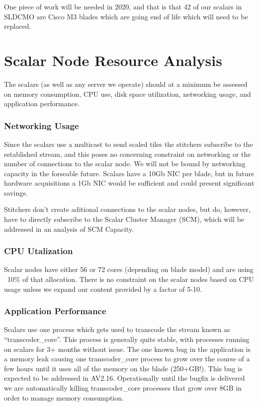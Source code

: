 \documentclass{article}
\begin{document}
One piece of work will be needed in 2020, and that is that 42 of our scalars in SLDCMO are Cisco M3 blades which are going end of life which will need to be replaced. 



\section{Scalar Node Resource Analysis}
\label{SECTION-NODES}

The scalars (as well as any server we operate) should at a minimum be assessed on memory consumption, CPU use, disk space utilization, networking usage, and application performance. 

\subsubsection{Networking Usage}
\label{SECTION-Networking}

Since the scalars use a multicast to send scaled tiles the stitchers subscribe to the established stream, and this poses no concerning constraint on networking or the number of connections to the scalar node. We will not be bound by networking capacity in the forseable future. Scalars have a 10Gb NIC per blade, but in future hardware acquisitions a 1Gb NIC would be sufficient and could present significant savings. 

Stitchers don't create aditional connections to the scalar nodes, but do, however, have to directly subscribe to the Scalar Cluster Manager (SCM), which will be addressed in an analysis of SCM Capacity.

\subsubsection{CPU Utalization}
\label{SECTION-CPUUse}

Scalar nodes have either 56 or 72 cores (depending on blade model) and are using ~10\% of that allocation. There is no constraint on the scalar nodes based on CPU usage unless we expand our content provided by a factor of 5-10. 

\subsubsection{Application Performance}
\label{SECTION-APPPerf}

Scalars use one process which gets used to transcode the stream known as ``transcoder\_core''. This process is generally quite stable, with processes running on scalars for 3+ months without issue. The one known bug in the application is a memory leak causing one transcoder\_core process to grow over the course of a few hours until it uses all of the memory on the blade (250+GB!). This bug is expected to be addressed in AV2.16. Operationally until the bugfix is delivered we are automatically killing transcoder\_core processes that grow over 8GB in order to manage memory consumption. 
\end{document}
